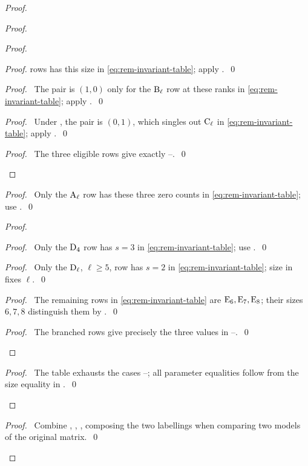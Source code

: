 \begin{proof}
\begin{proof}
\begin{proof}
\begin{proof}
rows has this size in \eqref{eq:rem-invariant-table};
apply .~\qed\end{proof}
\begin{proof}\pf\ The pair is $(1,0)$ only for the $\mathrm{B}_\ell$
row at these ranks in \eqref{eq:rem-invariant-table};
apply .~\qed\end{proof}
\begin{proof}\pf\ Under , the pair is $(0,1)$,
which singles out $\mathrm{C}_\ell$ in \eqref{eq:rem-invariant-table};
apply .~\qed\end{proof}
\qedstep
\begin{proof}\pf\ The three eligible rows give exactly
--.~\qed\end{proof}
\end{proof}
\begin{proof}\pf\ Only the $\mathrm{A}_\ell$ row has these three zero
counts in \eqref{eq:rem-invariant-table}; use .~\qed\end{proof}
\begin{proof}
\begin{proof}\pf\ Only the $\mathrm{D}_4$ row has $s=3$ in
\eqref{eq:rem-invariant-table}; use .~\qed\end{proof}
\begin{proof}\pf\ Only the $\mathrm{D}_\ell$, $\ell\geq5$, row has $s=2$
in \eqref{eq:rem-invariant-table}; size in  fixes $\ell$.~\qed\end{proof}
\begin{proof}\pf\ The remaining rows in \eqref{eq:rem-invariant-table}
are $\mathrm{E}_6,\mathrm{E}_7,\mathrm{E}_8$; their sizes $6,7,8$ distinguish
them by .~\qed\end{proof}
\qedstep
\begin{proof}\pf\ The branched rows give precisely the three values
in --.~\qed\end{proof}
\end{proof}
\qedstep
\begin{proof}\pf\ The table exhausts the cases
--; all parameter equalities
follow from the size equality in .~\qed\end{proof}
\end{proof}
\qedstep
\begin{proof}\pf\ Combine , ,
, composing the two labellings when comparing
two models of the original matrix.~\qed\end{proof}
\end{proof}

